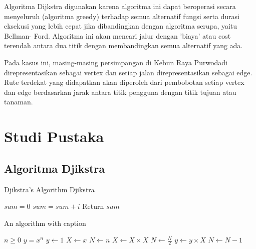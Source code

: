 \documentclass[conference]{IEEEtran}
\begin{document}
Algoritma Dijkstra digunakan karena algoritma ini dapat
beroperasi secara menyeluruh (algoritma greedy) terhadap
semua alternatif fungsi serta durasi eksekusi yang lebih cepat
jika dibandingkan dengan algoritma serupa, yaitu Bellman-
Ford. Algoritma ini akan mencari jalur dengan ’biaya’ atau
cost terendah antara dua titik dengan membandingkan semua
alternatif yang ada.

Pada kasus ini, masing-masing persimpangan di Kebun
Raya Purwodadi direpresentasikan sebagai vertex dan setiap
jalan direpresentasikan sebagai edge. Rute terdekat yang didapatkan
akan diperoleh dari pembobotan setiap vertex dan edge
berdasarkan jarak antara titik pengguna dengan titik tujuan
atau tanaman.

\section{Studi Pustaka}

\subsection{Algoritma Djikstra}

\begin{algorithm}
    \caption{Djikstra's Algorithm Djikstra}
    \begin{algorithmic}[1]
        \State $sum = 0$
            \State $sum = sum + i$
        \EndFor
        \State Return $sum$
    \EndProcedure
    \end{algorithmic}
\end{algorithm}

\begin{algorithm}
    \caption{An algorithm with caption}\label{alg:cap}
    \begin{algorithmic}
    \Require $n \geq 0$
    \Ensure $y = x^n$
    \State $y \gets 1$
    \State $X \gets x$
    \State $N \gets n$
        \State $X \gets X \times X$
        \State $N \gets \frac{N}{2}$  
        \State $y \gets y \times X$
        \State $N \gets N - 1$
    \EndIf
    \EndWhile
    \end{algorithmic}
    \end{algorithm}
    
\end{document}
